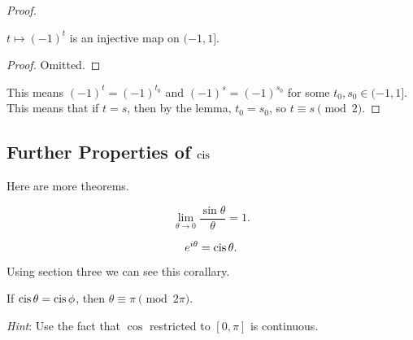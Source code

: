 \documentclass[notes]{subfile}
\begin{document}
\begin{proof}
    \begin{lemma}
        $t \mapsto (-1)^t$ is an injective map on $(-1, 1]$.
    \end{lemma}

    \begin{proof}
        Omitted.
    \end{proof}

    This means $(-1)^t = (-1)^{t_0}$ and $(-1)^s = (-1)^{s_0}$
    for some $t_0, s_0 \in (-1, 1]$.
    This means that if $t = s$, then by the lemma, $t_0 = s_0$,
    so $t \equiv s \pmod{2}$.
    
\end{proof}

\subsection{Further Properties of $\operatorname{cis}$}

Here are more theorems.

\begin{theorem}
    \[ \lim_{\theta \to 0} \frac{\sin \theta}{\theta} = 1. \]
\end{theorem}

\begin{theorem}
    \[ e^{i \theta} = \operatorname{cis} \theta. \]
\end{theorem}

Using section three we can see this corallary.
\begin{cor}
    If $\operatorname{cis}{\theta} = \operatorname{cis}{\phi}$, then $\theta \equiv \pi \pmod{2\pi}$.
\end{cor}
\emph{Hint}: Use the fact that $\cos$ restricted to $[0,\pi]$ is continuous.
\end{document}
